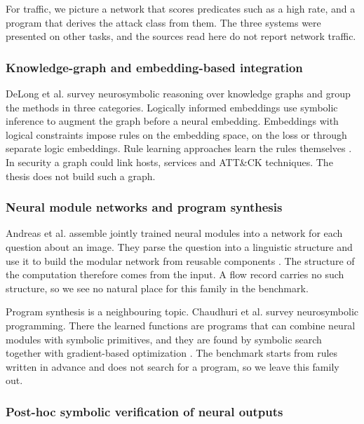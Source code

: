 For traffic, we picture a network that scores predicates such as a high
rate, and a program that derives the attack class from them. The three systems were presented on other tasks, and the
sources read here do not report network traffic.

\subsubsection{Knowledge-graph and embedding-based integration}
\label{sec:kg-integration}

DeLong et al. survey neurosymbolic reasoning over knowledge graphs and group
the methods in three categories. Logically informed embeddings use symbolic
inference to augment the graph before a neural embedding. Embeddings with
logical constraints impose rules on the embedding space, on the loss or
through separate logic embeddings. Rule learning approaches learn the rules
themselves \citep{delong2024kgsurvey}. In security a graph could link hosts,
services and ATT\&CK techniques. The thesis does not build such a graph.

\subsubsection{Neural module networks and program synthesis}
\label{sec:neural-modules}

Andreas et al. assemble jointly trained neural modules into a network for
each question about an image. They parse the question into a linguistic
structure and use it to build the modular network from reusable components
\citep{andreas2015neuralmodule}. The structure of the computation therefore
comes from the input. A flow record carries no such structure, so we see no
natural place for this family in the benchmark.

Program synthesis is a neighbouring topic. Chaudhuri et al. survey
neurosymbolic programming. There the learned functions are programs that can
combine neural modules with symbolic primitives, and they are found by symbolic
search together with gradient-based optimization
\citep{chaudhuri2021neurosymbolic}. The benchmark starts from rules written in
advance and does not search for a program, so we leave this family out.

\subsubsection{Post-hoc symbolic verification of neural outputs}
\label{sec:post-hoc-verification}

